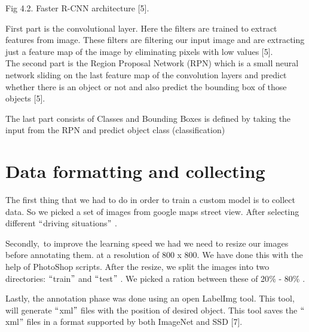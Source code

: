 \documentclass[12pt]{report}
\renewcommand{\_}{\kern-1.5pt\textunderscore\kern-1.5pt}
\begin{document}
\par

\begin{justify}
\tab \tab \tab Fig 4.2. Faster R-CNN architecture [5].
\end{justify}\par


\vspace{\baselineskip}

\vspace{\baselineskip}
First part is the convolutional layer. Here the filters are trained to extract features from image. These filters are filtering our input image and are extracting just a feature map of the image by eliminating pixels with low values [5].\\
\tab The second part is the Region Proposal Network (RPN) which is a small neural network sliding on the last feature map of the convolution layers and predict whether there is an object or not and also predict the bounding box of those objects [5].\par

The last part consists of Classes and Bounding Boxes is defined by taking the input from the RPN and predict object class (classification)\par

\section{Data formatting and collecting}
\begin{justify}
\tab The first thing that we had to do in order to train a custom model is to collect data. So we picked a set of images from google maps street view. After selecting different $``$driving situations$"$ . 
\end{justify}\par

\tab Secondly,\ to improve the learning speed we had we need to resize our images before annotating them.  at a resolution of 800 x 800. We have done this with the help of PhotoShop scripts. After the resize, we split the images into two directories: $``$train$"$  and $``$test$"$ . We picked a ration between these of 20$\%$  - 80$\%$ .\par

\tab Lastly, the annotation phase was done using an open LabelImg tool. This tool, will generate $``$xml$"$  files with the position of desired object. This tool saves the $``$xml$"$  files in a format supported by both ImageNet and SSD [7].\par
\end{document}
